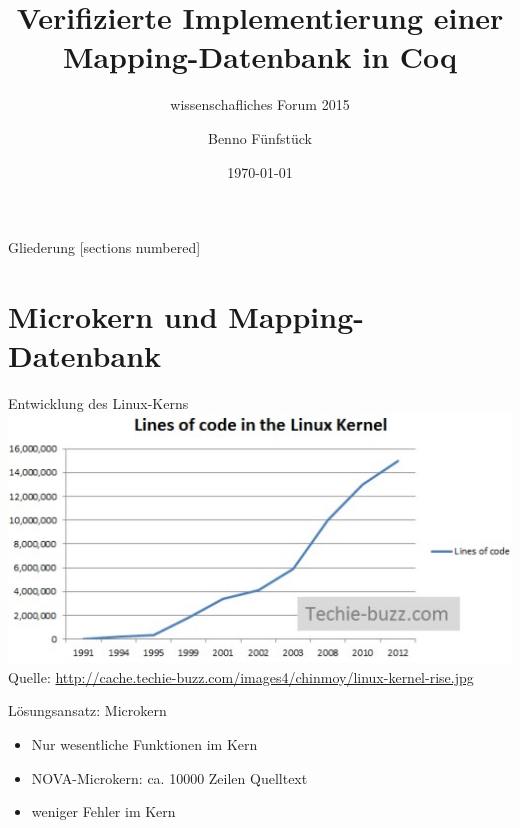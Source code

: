 \documentclass{beamer}
\begin{document}
\title{Verifizierte Implementierung einer Mapping-Datenbank in Coq}
\subtitle{wissenschafliches Forum 2015}
\author{Benno Fünfstück}
\date{\today}

\maketitle

\begin{frame}{Gliederung}
  [sections numbered]
  \tableofcontents
\end{frame}

\section{Microkern und Mapping-Datenbank}

\begin{frame}{Entwicklung des Linux-Kerns}
  \centering
  \includegraphics[width=\textwidth]{img/linux-loc2.jpg}\\
  \vfill
  \scriptsize{Quelle:} \url{http://cache.techie-buzz.com/images4/chinmoy/linux-kernel-rise.jpg}
\end{frame}

\begin{frame}{Lösungsansatz: Microkern}
  \begin{itemize}
    \item Nur wesentliche Funktionen im Kern
    \item NOVA-Microkern: ca. 10000 Zeilen Quelltext
    \item weniger Fehler im Kern
  \end{itemize}
\end{frame}
\end{document}
